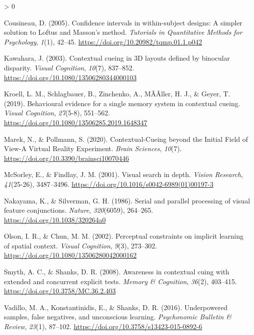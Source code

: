 \documentclass[
  english,
  man,floatsintext]{apa7}
\newlength{\cslhangindent}
\newenvironment{CSLReferences}[2] %
 {%
  \setlength{\parindent}{0pt}
  \ifodd #1 \everypar{\setlength{\hangindent}{\cslhangindent}}\ignorespaces\fi
  \ifnum #2 > 0
  \setlength{\parskip}{#2\baselineskip}
  \fi
 }%
 {}
\begin{document}
\begin{CSLReferences}{1}{0}
\leavevmode\hypertarget{ref-cousineau2005}{}%
Cousineau, D. (2005). Confidence intervals in within-subject designs: {A} simpler solution to {Loftus} and {Masson}'s method. \emph{Tutorials in Quantitative Methods for Psychology}, \emph{1}(1), 42--45. \url{https://doi.org/10.20982/tqmp.01.1.p042}

\leavevmode\hypertarget{ref-kawahara2003}{}%
Kawahara, J. (2003). Contextual cueing in {3D} layouts defined by binocular disparity. \emph{Visual Cognition}, \emph{10}(7), 837--852. \url{https://doi.org/10.1080/13506280344000103}

\leavevmode\hypertarget{ref-kroell2019}{}%
Kroell, L. M., Schlagbauer, B., Zinchenko, A., MÃÂller, H. J., \& Geyer, T. (2019). Behavioural evidence for a single memory system in contextual cueing. \emph{Visual Cognition}, \emph{27}(5-8), 551--562. \url{https://doi.org/10.1080/13506285.2019.1648347}

\leavevmode\hypertarget{ref-marek2020}{}%
Marek, N., \& Pollmann, S. (2020). Contextual-{Cueing} beyond the {Initial Field} of {View}-{A Virtual Reality Experiment}. \emph{Brain Sciences}, \emph{10}(7). \url{https://doi.org/10.3390/brainsci10070446}

\leavevmode\hypertarget{ref-mcsorley2001}{}%
McSorley, E., \& Findlay, J. M. (2001). Visual search in depth. \emph{Vision Research}, \emph{41}(25-26), 3487--3496. \url{https://doi.org/10.1016/s0042-6989(01)00197-3}

\leavevmode\hypertarget{ref-nakayama1986}{}%
Nakayama, K., \& Silverman, G. H. (1986). Serial and parallel processing of visual feature conjunctions. \emph{Nature}, \emph{320}(6059), 264--265. \url{https://doi.org/10.1038/320264a0}

\leavevmode\hypertarget{ref-olson2002}{}%
Olson, I. R., \& Chun, M. M. (2002). Perceptual constraints on implicit learning of spatial context. \emph{Visual Cognition}, \emph{9}(3), 273--302. \url{https://doi.org/10.1080/13506280042000162}

\leavevmode\hypertarget{ref-smyth2008}{}%
Smyth, A. C., \& Shanks, D. R. (2008). Awareness in contextual cuing with extended and concurrent explicit tests. \emph{Memory \& Cognition}, \emph{36}(2), 403--415. \url{https://doi.org/10.3758/MC.36.2.403}

\leavevmode\hypertarget{ref-vadillo2016}{}%
Vadillo, M. A., Konstantinidis, E., \& Shanks, D. R. (2016). Underpowered samples, false negatives, and unconscious learning. \emph{Psychonomic Bulletin \& Review}, \emph{23}(1), 87--102. \url{https://doi.org/10.3758/s13423-015-0892-6}


\end{CSLReferences}
\end{document}

